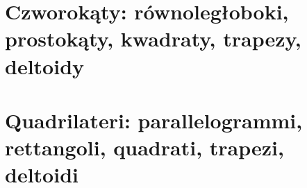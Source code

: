 %

\chapter{Czworokąty: równoległoboki, prostokąty, kwadraty, trapezy, deltoidy} %
\chapter{Quadrilateri: parallelogrammi, rettangoli, quadrati, trapezi, deltoidi} %










%